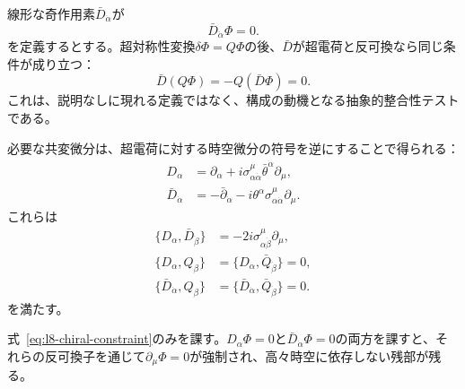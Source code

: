 線形な奇作用素\(\bar D_{\dot\alpha}\)が
\begin{equation}
\bar D_{\dot\alpha}\Phi=0.
\label{eq:l8-chiral-constraint}
\end{equation}
を定義するとする。超対称性変換\(\delta\Phi=Q\Phi\)の後、\(\bar D\)が超電荷と反可換なら同じ条件が成り立つ：
\begin{equation}
\bar D(Q\Phi)=-Q(\bar D\Phi)=0.
\end{equation}
これは、説明なしに現れる定義ではなく、構成の動機となる抽象的整合性テストである。

\begin{classroomqa}
\end{classroomqa}

必要な共変微分は、超電荷に対する時空微分の符号を逆にすることで得られる：
\begin{align}
D_\alpha
&=\partial_\alpha
+i\sigma^\mu_{\alpha\dot\alpha}
\bar\theta^{\dot\alpha}\partial_\mu,
\label{eq:l8-D}\\
\bar D_{\dot\alpha}
&=-\bar\partial_{\dot\alpha}
-i\theta^\alpha\sigma^\mu_{\alpha\dot\alpha}\partial_\mu.
\label{eq:l8-Dbar}
\end{align}
これらは
\begin{align}
\{D_\alpha,\bar D_{\dot\beta}\}
&=-2i\sigma^\mu_{\alpha\dot\beta}\partial_\mu,\\
\{D_\alpha,Q_\beta\}
&=\{D_\alpha,\bar Q_{\dot\beta}\}=0,\\
\{\bar D_{\dot\alpha},Q_\beta\}
&=\{\bar D_{\dot\alpha},\bar Q_{\dot\beta}\}=0.
\end{align}
を満たす。

\begin{classroomqa}
\end{classroomqa}

式~\eqref{eq:l8-chiral-constraint}のみを課す。\(D_\alpha\Phi=0\)と\(\bar D_{\dot\alpha}\Phi=0\)の両方を課すと、それらの反可換子を通じて\(\partial_\mu\Phi=0\)が強制され、高々時空に依存しない残部が残る。

